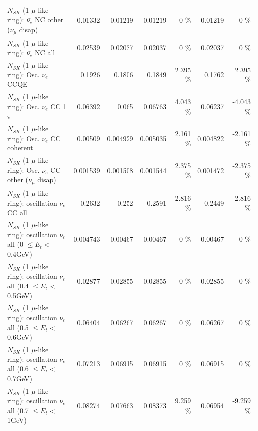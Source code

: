\begin{table}
\begin{tabular}{| l | r | r | r  r | r  r |}
          $N_{SK}$ (1 $\mu$-like ring): $\bar{\nu_e}$ NC other ($\nu_\mu$ disap) &         0.01332 &         0.01219 &         0.01219 &        0 \%  &         0.01219 &        0 \%  \\ 
                            $N_{SK}$ (1 $\mu$-like ring): $\bar{\nu_{e}}$ NC all &         0.02539 &         0.02037 &         0.02037 &        0 \%  &         0.02037 &        0 \%  \\ 
\hline
\hline
\hline
                                 $N_{SK}$ (1 $\mu$-like ring): Osc. $\nu_e$ CCQE &          0.1926 &          0.1806 &          0.1849 &    2.395 \%  &          0.1762 &   -2.395 \%  \\ 
                            $N_{SK}$ (1 $\mu$-like ring): Osc. $\nu_e$ CC 1$\pi$ &         0.06392 &           0.065 &         0.06763 &    4.043 \%  &         0.06237 &   -4.043 \%  \\ 
                          $N_{SK}$ (1 $\mu$-like ring): Osc. $\nu_e$ CC coherent &         0.00509 &        0.004929 &        0.005035 &    2.161 \%  &        0.004822 &   -2.161 \%  \\ 
           $N_{SK}$ (1 $\mu$-like ring): Osc. $\nu_e$ CC other ($\nu_\mu$ disap) &        0.001539 &        0.001508 &        0.001544 &    2.375 \%  &        0.001472 &   -2.375 \%  \\ 
                        $N_{SK}$ (1 $\mu$-like ring): oscillation $\nu_e$ CC all &          0.2632 &           0.252 &          0.2591 &    2.816 \%  &          0.2449 &   -2.816 \%  \\ 
\hline
$N_{SK}$ (1 $\mu$-like ring): oscillation $\nu_{e}$ all (0 $\leq E_{t} <$ 0.4GeV) &        0.004743 &         0.00467 &         0.00467 &        0 \%  &         0.00467 &        0 \%  \\ 
$N_{SK}$ (1 $\mu$-like ring): oscillation $\nu_{e}$ all (0.4 $\leq E_{t} <$ 0.5GeV) &         0.02877 &         0.02855 &         0.02855 &        0 \%  &         0.02855 &        0 \%  \\ 
$N_{SK}$ (1 $\mu$-like ring): oscillation $\nu_{e}$ all (0.5 $\leq E_{t} <$ 0.6GeV) &         0.06404 &         0.06267 &         0.06267 &        0 \%  &         0.06267 &        0 \%  \\ 
$N_{SK}$ (1 $\mu$-like ring): oscillation $\nu_{e}$ all (0.6 $\leq E_{t} <$ 0.7GeV) &         0.07213 &         0.06915 &         0.06915 &        0 \%  &         0.06915 &        0 \%  \\ 
$N_{SK}$ (1 $\mu$-like ring): oscillation $\nu_{e}$ all (0.7 $\leq E_{t} <$ 1GeV) &         0.08274 &         0.07663 &         0.08373 &    9.259 \%  &         0.06954 &   -9.259 \%  \\ 

\end{tabular}
\end{table}
